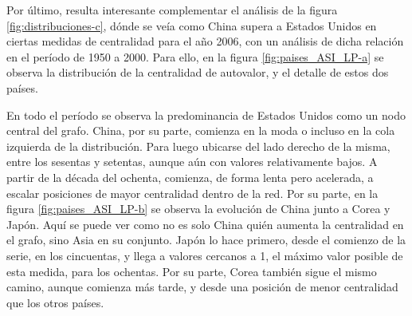 \documentclass[a4paper]{article}
\begin{document}
Por último, resulta interesante complementar el análisis de la figura \ref{fig:distribuciones-c}, dónde se veía como China supera a Estados Unidos en ciertas medidas de centralidad para el año 2006, con un análisis de dicha relación en el período de 1950 a 2000. Para ello, en la figura \ref{fig:paises_ASI_LP-a} se observa la distribución de la centralidad de autovalor, y el detalle de estos dos países. \par
En todo el período se observa la predominancia de Estados Unidos como un nodo central del grafo. China, por su parte, comienza en la moda o incluso en la cola izquierda de la distribución. Para luego ubicarse del lado derecho de la misma, entre los sesentas y setentas, aunque aún con valores relativamente bajos. A partir de la década del ochenta, comienza, de forma lenta pero acelerada, a escalar posiciones de mayor centralidad dentro de la red. 
Por su parte, en la figura \ref{fig:paises_ASI_LP-b} se observa la evolución de China junto a Corea y Japón. Aquí se puede ver como no es solo China quién aumenta la centralidad en el grafo, sino Asia en su conjunto. Japón lo hace primero, desde el comienzo de la serie, en los cincuentas, y llega a valores cercanos a 1, el máximo valor posible de esta medida, para los ochentas. Por su parte, Corea también sigue el mismo camino, aunque comienza más tarde, y desde una posición de menor centralidad que los otros países. 
\end{document}
